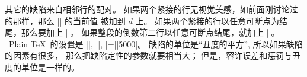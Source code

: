 \ddanger 其它的缺陷来自相邻行的配对。%
如果两个紧接的行无视觉美感，如前面刚讨论过的那样，那么 |\adjdemerits| 的当前值%
被加到 $d$ 上。%
如果两个紧接的行以任意可断点为结尾，那么要加上 |\doublehyphendemerits|。%
如果整段的倒数第二行以任意可断点结尾，就加上 |\finalhyphendemerits|。%
~Plain \TeX\ 的设置是 ||, ||,
|\finalhyphendemerits=|\break|5000|。%
缺陷的单位是``丑度的平方'', 所以如果缺陷的因素有很多，
那么把缺陷定性的参数就要相当大；
但是，容许误差和惩罚与丑度的单位是一样的。

